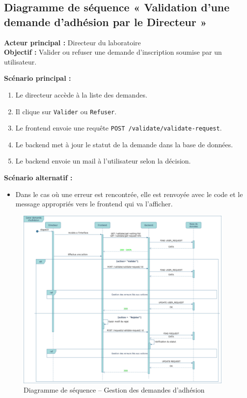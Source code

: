 \subsection{Diagramme de séquence « Validation d'une demande d'adhésion par le Directeur »}

\textbf{Acteur principal :} Directeur du laboratoire \\
\textbf{Objectif :} Valider ou refuser une demande d'inscription soumise par un utilisateur.

\textbf{Scénario principal :}
\begin{enumerate}
  \item Le directeur accède à la liste des demandes.
  \item Il clique sur \texttt{Valider} ou \texttt{Refuser}.
  \item Le frontend envoie une requête \texttt{POST /validate/validate-request}.
  \item Le backend met à jour le statut de la demande dans la base de données.
  \item Le backend envoie un mail à l'utilisateur selon la décision.
\end{enumerate}

\textbf{Scénario alternatif :}
\begin{itemize}
  \item Dans le cas où une erreur est rencontrée, elle est renvoyée avec le code et le message appropriés vers le frontend qui va l'afficher.
\end{itemize}

\begin{figure}[H]
  \centering
  \includegraphics[width=0.95\textwidth]{images/diagramme_de_sequence/gestion_adhesion.png}
  \caption{Diagramme de séquence – Gestion des demandes d'adhésion}
\end{figure}


